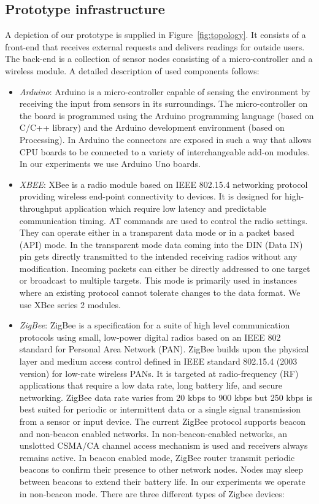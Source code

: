 \subsection{Prototype infrastructure}
A depiction of our prototype is supplied in Figure~\ref{fig:topology}. It consists of a front-end that receives external requests and delivers readings for outside users. The back-end is a collection of sensor nodes consisting of a micro-controller and a wireless module. A detailed description of used components follows:
\begin{itemize}
\item{\emph{Arduino}: Arduino is a micro-controller capable of sensing the environment by receiving the input from sensors in its surroundings. The micro-controller on the board is programmed using the Arduino programming language (based on C/C++ library) and the Arduino development environment (based on Processing). In Arduino the connectors are exposed in such a way that allows CPU boards to be connected to a variety of interchangeable add-on modules. In our experiments we use Arduino Uno boards.}
\item{\emph{XBEE}: XBee is a radio module based on IEEE 802.15.4 networking protocol providing wireless end-point connectivity to devices.  It is designed for high-throughput application which require low latency and predictable communication timing. AT commands are used to control the radio settings. They can operate either in a transparent data mode or in a packet based (API) mode. In the transparent mode data coming into the DIN (Data IN) pin gets directly transmitted to the intended receiving radios without any modification. Incoming packets can either be directly addressed to one target or broadcast to multiple targets. This mode is primarily used in instances where an existing protocol cannot tolerate changes to the data format. We use XBee series 2 modules.}
\item{\emph{ZigBee}: ZigBee is a specification for a suite of high level communication protocols using small, low-power digital radios based on an IEEE 802 standard for Personal Area Network (PAN). ZigBee builds upon the physical layer and medium access control defined in IEEE standard 802.15.4 (2003 version) for low-rate wireless PANs.  It is targeted at radio-frequency (RF) applications that require a low data rate, long battery life, and secure networking. ZigBee data rate varies from 20 kbps to 900 kbps but 250 kbps is best suited for periodic or intermittent data or a single signal transmission from a sensor or input device. The current ZigBee protocol supports beacon and non-beacon enabled networks.  In non-beacon-enabled networks, an unslotted CSMA/CA channel access mechanism is used and receivers always remains active. In beacon enabled mode, ZigBee router transmit periodic beacons to confirm their presence to other network nodes. Nodes may sleep between beacons to extend their battery life. In our experiments we operate in non-beacon mode. There are three different types of Zigbee devices: 
}
\end{itemize}
